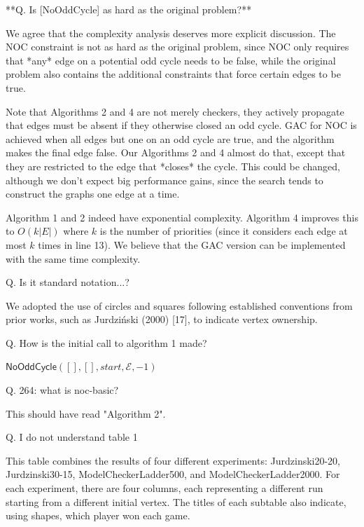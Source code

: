 \documentclass{article}
\begin{document}
**Q. Is [NoOddCycle] as hard as the original problem?**

We agree that the complexity analysis deserves more explicit discussion. The NOC constraint is not as hard as the original problem, since NOC only requires that *any* edge on a potential odd cycle needs to be false, while the original problem also contains the additional constraints that force certain edges to be true. 

Note that Algorithms 2 and 4 are not merely checkers, they actively propagate that edges must be absent if they otherwise closed an odd cycle. GAC for NOC is achieved when all edges but one on an odd cycle are true, and the algorithm makes the final edge false. Our Algorithms 2 and 4 almost do that, except that they are restricted to the edge that *closes* the cycle. This could be changed, although we don't expect big performance gains, since the search tends to construct the graphs one edge at a time. 

Algorithm 1 and 2 indeed have exponential complexity. Algorithm 4 improves this to $O(k|E|)$ where $k$ is the number of priorities (since it considers each edge at most $k$ times in line 13). We believe that the GAC version can be implemented with the same time complexity.

Q. Is it standard notation...?

We adopted the use of circles and squares following established conventions from prior works, such as Jurdziński (2000) [17], to indicate vertex ownership.

Q. How is the initial call to algorithm 1 made? 

$\textsf{NoOddCycle}([],[],\textit{start},\mathcal{E},-1)$

Q. 264: what is noc-basic?

This should have read "Algorithm 2".

Q. I do not understand table 1

This table combines the results of four different experiments: Jurdzinski20-20, Jurdzinski30-15, ModelCheckerLadder500, and ModelCheckerLadder2000. For each experiment, there are four columns, each representing a different run starting from a different initial vertex. The titles of each subtable also indicate, using shapes, which player won each game.
\end{document}
